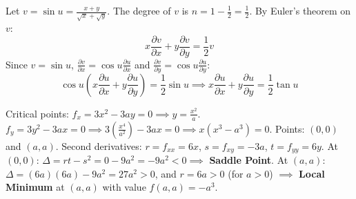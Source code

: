 \begin{solutionbox}
Let $v = \sin u = \frac{x + y}{\sqrt{x} + \sqrt{y}}$. The degree of $v$ is $n = 1 - \frac{1}{2} = \frac{1}{2}$.
By Euler's theorem on $v$:
\[
x \frac{\partial v}{\partial x} + y \frac{\partial v}{\partial y} = \frac{1}{2} v
\]
Since $v = \sin u$, $\frac{\partial v}{\partial x} = \cos u \frac{\partial u}{\partial x}$ and $\frac{\partial v}{\partial y} = \cos u \frac{\partial u}{\partial y}$:
\[
\cos u \left( x \frac{\partial u}{\partial x} + y \frac{\partial u}{\partial y} \right) = \frac{1}{2} \sin u \implies x \frac{\partial u}{\partial x} + y \frac{\partial u}{\partial y} = \frac{1}{2}\tan u
\]
\end{solutionbox}

\begin{solutionbox}
Critical points: $f_x = 3x^2 - 3ay = 0 \implies y = \frac{x^2}{a}$.
$f_y = 3y^2 - 3ax = 0 \implies 3\left(\frac{x^4}{a^2}\right) - 3ax = 0 \implies x(x^3 - a^3) = 0$.
Points: $(0,0)$ and $(a,a)$.
Second derivatives: $r = f_{xx} = 6x$, $s = f_{xy} = -3a$, $t = f_{yy} = 6y$.
At $(0,0)$: $\Delta = rt - s^2 = 0 - 9a^2 = -9a^2 < 0 \implies$ \textbf{Saddle Point}.
At $(a,a)$: $\Delta = (6a)(6a) - 9a^2 = 27a^2 > 0$, and $r = 6a > 0$ (for $a > 0$) $\implies$ \textbf{Local Minimum} at $(a,a)$ with value $f(a,a) = -a^3$.
\end{solutionbox}

\newpage
